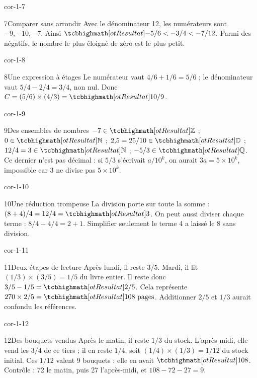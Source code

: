 \begin{blocLivre}{cor-1-7}\begin{corrige}{7}{Comparer sans arrondir}
Avec le dénominateur 12, les numérateurs sont $-9,-10,-7$. Ainsi $\res{-5/6<-3/4<-7/12}$. Parmi des négatifs, le nombre le plus éloigné de zéro est le plus petit.
\end{corrige}\end{blocLivre}
\begin{blocLivre}{cor-1-8}\begin{corrige}{8}{Une expression à étages}
Le numérateur vaut $4/6+1/6=5/6$ ; le dénominateur vaut $5/4-2/4=3/4$, non nul. Donc $C=(5/6)\times(4/3)=\res{10/9}$.
\end{corrige}\end{blocLivre}
\begin{blocLivre}{cor-1-9}\begin{corrige}{9}{Des ensembles de nombres}
$-7\in\res{\mathbb Z}$ ; $0\in\res{\mathbb N}$ ; $2{,}5=25/10\in\res{\mathbb D}$ ; $12/4=3\in\res{\mathbb N}$ ; $-5/3\in\res{\mathbb Q}$. Ce dernier n’est pas décimal : si $5/3$ s’écrivait $a/10^k$, on aurait $3a=5\times10^k$, impossible car 3 ne divise pas $5\times10^k$.
\end{corrige}\end{blocLivre}
\begin{blocLivre}{cor-1-10}\begin{corrige}{10}{Une réduction trompeuse}
La division porte sur toute la somme : $(8+4)/4=12/4=\res3$. On peut aussi diviser chaque terme : $8/4+4/4=2+1$. Simplifier seulement le terme 4 a laissé le 8 sans division.
\end{corrige}\end{blocLivre}
\begin{blocLivre}{cor-1-11}\begin{corrige}{11}{Deux étapes de lecture}
Après lundi, il reste $3/5$. Mardi, il lit $(1/3)\times(3/5)=1/5$ du livre entier. Il reste donc $3/5-1/5=\res{2/5}$. Cela représente $270\times2/5=\res{108\text{ pages}}$. Additionner $2/5$ et $1/3$ aurait confondu les références.
\end{corrige}\end{blocLivre}
\begin{blocLivre}{cor-1-12}\begin{corrige}{12}{Des bouquets vendus}
Après le matin, il reste $1/3$ du stock. L’après-midi, elle vend les $3/4$ de ce tiers ; il en reste $1/4$, soit $(1/4)\times(1/3)=1/12$ du stock initial. Ces $1/12$ valent 9 bouquets : elle en avait $\res{108}$. Contrôle : 72 le matin, puis 27 l’après-midi, et $108-72-27=9$.
\end{corrige}\end{blocLivre}

